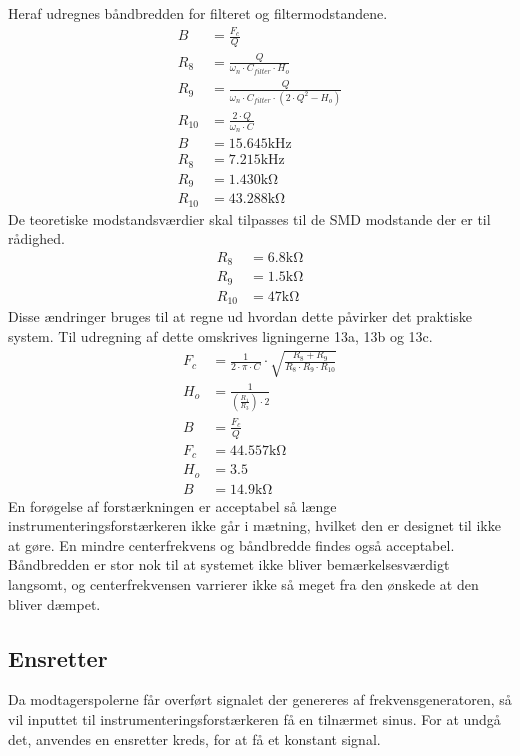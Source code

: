 Heraf udregnes båndbredden for filteret og filtermodstandene. \cite[Side. 209]{Huelsman1993}
\begin{align}
B & = \frac{F_c}{Q} \\
R_8 & = \frac{Q}{\omega_n \cdot C_{filter} \cdot H_o } \\
R_9 & = \frac{Q}{ \omega_n \cdot C_{filter} \cdot \left( 2 \cdot Q^2 - H_o \right) } \\
R_{10} & = \frac{2 \cdot Q}{ \omega_n \cdot C} \\
B & = 15.645 \si{\kilo\hertz} \nonumber \\
R_8 & = 7.215 \si{\kilo\hertz} \nonumber \\
R_9 & = 1.430 \si{\kilo\ohm} \nonumber \\
R_{10} & = 43.288 \si{\kilo\ohm} \nonumber 
\end{align}
De teoretiske modstandsværdier skal tilpasses til de SMD modstande der er til rådighed.
\begin{align}
	R_8 & = 6.8 \si{\kilo\ohm} \nonumber \\
	R_9 & = 1.5 \si{\kilo\ohm} \nonumber \\
	R_{10} & = 47 \si{\kilo\ohm} \nonumber
\end{align}
Disse ændringer bruges til at regne ud hvordan dette påvirker det praktiske system. Til udregning af dette omskrives ligningerne 13a, 13b og 13c. \cite[Side. 208]{Huelsman1993}
\begin{align}
	F_c & = \frac{1}{2 \cdot \pi \cdot C} \cdot \sqrt{\frac{R_8+R_9}{R_8 \cdot R_9 \cdot R_{10}}} \\
	H_o & = \frac{1}{\left( \frac{R_1}{R_3} \right) \cdot 2} \\
	B & = \frac{F_c}{Q} \\
	F_c & = 44.557 \si{\kilo\ohm} \nonumber \\
	H_o & = 3.5 \nonumber \\
	B & = 14.9 \si{\kilo\ohm} \nonumber
\end{align}
En forøgelse af forstærkningen er acceptabel så længe instrumenteringsforstærkeren ikke går i mætning, hvilket den er designet til ikke at gøre. En mindre centerfrekvens og båndbredde findes også acceptabel. Båndbredden er stor nok til at systemet ikke bliver bemærkelsesværdigt langsomt, og centerfrekvensen varrierer ikke så meget fra den ønskede at den bliver dæmpet.
\subsection{Ensretter}
Da modtagerspolerne får overført signalet der genereres af frekvensgeneratoren, så vil inputtet til instrumenteringsforstærkeren få en tilnærmet sinus. 
For at undgå det, anvendes en ensretter kreds, for at få et konstant signal.


